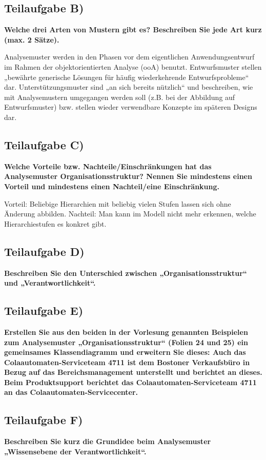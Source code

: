 \subsection{Teilaufgabe B)}
\textbf{Welche drei Arten von Mustern gibt es? Beschreiben Sie jede Art kurz
(max. 2 Sätze).}

Analysemuster werden in den Phasen vor dem eigentlichen Anwendungsentwurf im
Rahmen der objektorientierten Analyse (ooA) benutzt.
Entwurfsmuster stellen „bewährte generische Lösungen für häufig wiederkehrende
Entwurfsprobleme“ dar.
Unterstützungsmuster sind „an sich bereits nützlich“ und beschreiben, wie mit
Analysemustern umgegangen werden soll (z.B. bei der Abbildung auf Entwurfsmuster) bzw.
stellen wieder verwendbare Konzepte im späteren Designs dar.

\subsection{Teilaufgabe C)}
\textbf{Welche Vorteile bzw. Nachteile/Einschränkungen hat das Analysemuster
Organisationsstruktur? Nennen Sie mindestens einen Vorteil und mindestens einen
Nachteil/eine Einschränkung.}

Vorteil: Beliebige Hierarchien mit beliebig vielen Stufen lassen sich ohne Änderung abbilden.
Nachteil: Man kann im Modell nicht mehr erkennen, welche Hierarchiestufen es konkret gibt.


\subsection{Teilaufgabe D)}
\textbf{Beschreiben Sie den Unterschied zwischen „Organisationsstruktur“ und
„Verantwortlichkeit“.}


\subsection{Teilaufgabe E)}
\textbf{Erstellen Sie aus den beiden in der Vorlesung genannten Beispielen zum Analysemuster
„Organisationsstruktur“ (Folien 24 und 25) ein gemeinsames Klassendiagramm und
erweitern Sie dieses: Auch das Colaautomaten-Serviceteam 4711 ist dem Bostoner
Verkaufsbüro in Bezug auf das Bereichsmanagement unterstellt und berichtet an dieses.
Beim Produktsupport berichtet das Colaautomaten-Serviceteam 4711 an das
Colaautomaten-Servicecenter.}

\subsection{Teilaufgabe F)}
\textbf{Beschreiben Sie kurz die Grundidee beim Analysemuster „Wissensebene der
Verantwortlichkeit“.}


\clearpage 